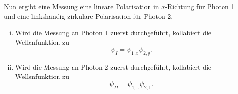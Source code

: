 \subsection{}

Nun ergibt eine Messung eine lineare Polarisation in $x$-Richtung für Photon 1 und eine linkshändig zirkulare Polarisation für Photon 2.
\begin{enumerate}[(i)]
    \item
        Wird die Messung an Photon 1 zuerst durchgeführt, kollabiert die Wellenfunktion zu
        \[
            \psi_I = \psi_{1,x}\psi_{2,y}.
        \]
    \item
        Wird die Messung an Photon 2 zuerst durchgeführt, kollabiert die Wellenfunktion zu
        \[
            \psi_{II} = \psi_{1,\text{L}}\psi_{2,\text{L}}.
        \]
\end{enumerate}

\subsection{}

